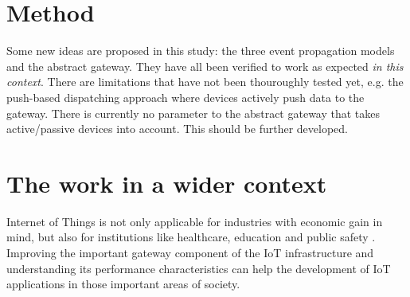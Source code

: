 \section{Method}
\label{sec:discussion-method}

Some new ideas are proposed in this study: the three event propagation models
and the abstract gateway. They have all been verified to work as expected
\textit{in this context}. There are limitations that have not been thouroughly
tested yet, e.g. the push-based dispatching approach where devices actively
push data to the gateway. There is currently no parameter to the abstract
gateway that takes active/passive devices into account. This should be further
developed.

\section{The work in a wider context}
\label{sec:work-wider-context}

Internet of Things is not only applicable for industries with economic gain in
mind, but also for institutions like healthcare, education and public safety
\cite{gubbi2013internet}. Improving the important gateway component of the IoT
infrastructure and understanding its performance characteristics can help the
development of IoT applications in those important areas of society.
